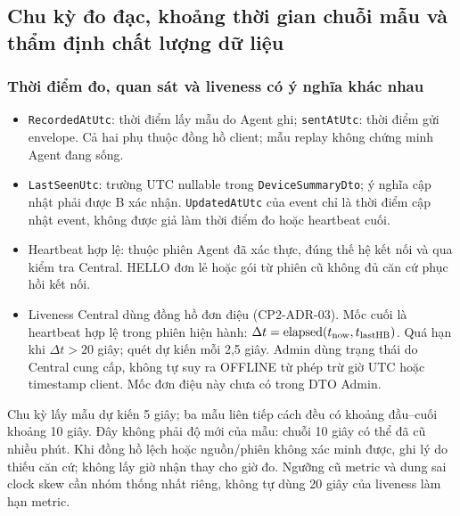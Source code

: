 \documentclass[12pt,a4paper]{article}
\begin{document}
\subsection{Chu kỳ đo đạc, khoảng thời gian chuỗi mẫu và thẩm định chất lượng dữ liệu}

\subsubsection{Thời điểm đo, quan sát và liveness có ý nghĩa khác nhau}
\begin{itemize}
\item \texttt{RecordedAtUtc}: thời điểm lấy mẫu do Agent ghi; \texttt{sentAtUtc}: thời điểm gửi envelope. Cả hai phụ thuộc đồng hồ client; mẫu replay không chứng minh Agent đang sống.
\item \texttt{LastSeenUtc}: trường UTC nullable trong \texttt{DeviceSummaryDto}; ý nghĩa cập nhật phải được B xác nhận. \texttt{UpdatedAtUtc} của event chỉ là thời điểm cập nhật event, không được giả làm thời điểm đo hoặc heartbeat cuối.
\item Heartbeat hợp lệ: thuộc phiên Agent đã xác thực, đúng thế hệ kết nối và qua kiểm tra Central. HELLO đơn lẻ hoặc gói từ phiên cũ không đủ căn cứ phục hồi kết nối.
\item Liveness Central dùng đồng hồ đơn điệu (CP2-ADR-03). Mốc cuối là heartbeat hợp lệ trong phiên hiện hành: $\Delta t=\operatorname{elapsed}(t_{\rm now},t_{\rm lastHB})$. Quá hạn khi $\Delta t>20$ giây; quét dự kiến mỗi 2,5 giây. Admin dùng trạng thái do Central cung cấp, không tự suy ra OFFLINE từ phép trừ giờ UTC hoặc timestamp client. Mốc đơn điệu này chưa có trong DTO Admin.
\end{itemize}
Chu kỳ lấy mẫu dự kiến 5 giây; ba mẫu liên tiếp cách đều có khoảng đầu--cuối khoảng 10 giây. Đây không phải độ mới của mẫu: chuỗi 10 giây có thể đã cũ nhiều phút. Khi đồng hồ lệch hoặc nguồn/phiên không xác minh được, ghi lý do thiếu căn cứ; không lấy giờ nhận thay cho giờ đo. Ngưỡng cũ metric và dung sai clock skew cần nhóm thống nhất riêng, không tự dùng 20 giây của liveness làm hạn metric.
\end{document}
